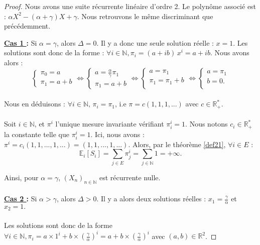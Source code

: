 \documentclass[12pt,a4paper]{report}
\theoremstyle{remark}
\begin{document}
\begin{proof}
Nous avons une suite récurrente linéaire d'ordre 2. Le polynôme associé est  : $\alpha X^2 -(\alpha+\gamma)X+\gamma$. Nous retrouvons le même discriminant que précédemment.

\vspace {0.5cm}
\textbf{\underline{Cas 1 } :} Si $\alpha = \gamma$, alors $\Delta = 0$. Il y a donc une seule solution réelle : $x =1.$
Les solutions sont donc de la forme : $\forall i \in \mathbb{N}, \pi_i = (a+ib) \, x^i = a+ib$. Nous avons alors : $$
\left\{
\begin{array}{ll}
        \pi_0 = a\\
        \pi_1 = a + b
    \end{array}
\right. 
\iff \left\{
\begin{array}{ll}
        a = \frac{\alpha}{\gamma}\pi_1\\
        \pi_1 = a + b
    \end{array}
    \right. 
\iff \left\{
\begin{array}{ll}
       a = \pi_1\\
       \pi_1 = \pi_1 + b\\
    \end{array}
    \right.
\iff \left\{
\begin{array}{ll}
       a = \pi_1\\
      b = 0 .\\
\end{array}
\right.
$$
\\
Nous en déduisons : $\forall i \in \mathbb{N}, \, \pi_i = \pi_1$, i.e $\pi = c (1,1,1,...)$ avec $c \in \mathbb{R}_+^*$.
\\
\\
Soit $i \in \mathbb{N}$, et $\pi^i$ l'unique mesure invariante vérifiant $\pi_i^i=1$. Nous notons $c_i\in \mathbb{R}_+^*$ la constante telle que $\pi_i^i=1$. Ici, nous avons : $\pi^i=c_i\left(1,1,...,1,...\right)=\left(1,1,...,1,...\right)$.
Alors, par le théorème \ref{def21}, $\forall i \in E$ :
$$\mathbb{E}_i[S_i]=\sum\limits_{j\in E }\pi_j^i = \sum\limits_{j\in\mathbb{N} }1 = +\infty.$$

Ainsi, pour $\alpha=\gamma$, $(X_n)_{n\in\mathbb{N}}$ est récurrente nulle.
\\
\\
\textbf{\underline{Cas 2 } :} Si $\alpha > \gamma$, alors $\Delta > 0$. Il y a alors deux solutions réelles : $x_1= \frac{\gamma}{\alpha}$ et $x_2=1.$
\\
\\
Les solutions sont donc de la forme $\forall i \in \mathbb {N}, \pi_i = a \times 1^i + b \times (\frac{\gamma}{\alpha})^i = a+b\times (\frac{\gamma}{\alpha})^i$ avec $ (a,b) \in \mathbb{R}^2$.


\end{proof}
\end{document}
